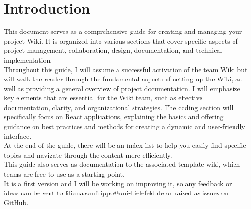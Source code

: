 \documentclass[a4paper, 11pt, twoside]{book}
\begin{document}
\pagecolor{pagecolor}
\frontmatter

\tableofcontents
\newpage


\pagecolor{pagecolor}


\section{Introduction}
This document serves as a comprehensive guide for creating and managing your project Wiki. It is organized into various sections that cover specific aspects of project management, collaboration, design, documentation, and technical implementation. \\
Throughout this guide, I will assume a successful activation of the team Wiki but will walk the reader through the fundamental aspects of setting up the Wiki, as well as providing a general overview of project documentation. I will emphasize key elements that are essential for the Wiki team, such as effective documentation, clarity, and organizational strategies. The coding section will specifically focus on React applications, explaining the basics and offering guidance on best practices and methods for creating a dynamic and user-friendly interface. \\ \newline
At the end of the guide, there will be an index list to help you easily find specific topics and navigate through the content more efficiently. \\
This guide also serves as documentation to the associated template wiki, which teams are free to use as a starting point. \\ \newline
It is a first version and I will be working on improving it, so any feedback or ideas can be sent to liliana.sanfilippo@uni-bielefeld.de or raised as issues on GitHub. \\ \newline
\end{document}

